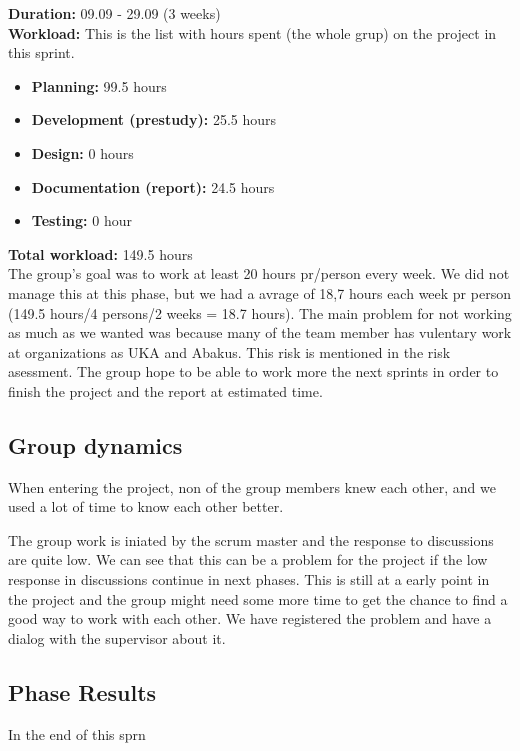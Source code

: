 		{\bf Duration:} 09.09 - 29.09 (3 weeks)\\
		{\bf Workload:} This is the list with hours spent (the whole grup) on the project in this sprint.
			\begin{itemize}
				\item {\bf Planning:} 99.5 hours
				\item {\bf Development (prestudy):} 25.5 hours
				\item {\bf Design:} 0 hours
				\item {\bf Documentation (report):} 24.5 hours
				\item {\bf Testing:} 0 hour
			\end{itemize}
		{\bf Total workload: } 149.5 hours \\
	The group's goal was to work at least 20 hours pr/person every week. We did not manage this at this phase, but we had a avrage of 18,7 hours each week pr person (149.5 hours/4 persons/2 weeks = 18.7 hours). 
	The main problem for not working as much as we wanted was because many of the team member has vulentary
	work at organizations as UKA and Abakus. This risk is mentioned in the risk asessment. The group 
	hope to be able to work more the next sprints in order to finish the project and the report at estimated
	time. 

\subsection{Group dynamics}
	When entering the project, non of the group members knew each other, and we used a lot
	of time to know each other better.

	The group work is iniated by the scrum master and the response to discussions are quite low.
	We can see that this can be a problem for the project if the low response in discussions 
	continue in next phases. This is still at a early point in the project and the group might need
	some more time to get the chance to find a good way to work with each other. 
	We have registered the problem and have a dialog with the supervisor about it. 

\subsection{Phase Results}
	In the end of this sprn
